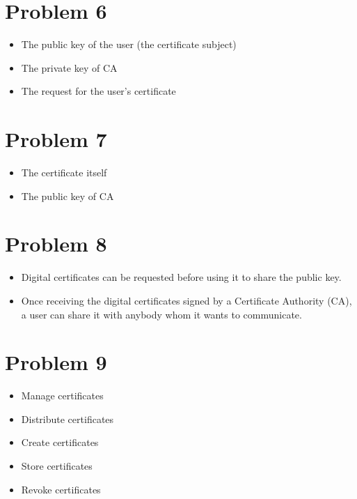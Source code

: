 \documentclass[11pt]{article}
\begin{document}
\section*{Problem 6}
\label{sec:org0d484ec}
\begin{itemize}
\item The public key of the user (the certificate subject)
\item The private key of CA
\item The request for the user's certificate
\end{itemize}
\section*{Problem 7}
\label{sec:org17f4ea5}
\begin{itemize}
\item The certificate itself
\item The public key of CA
\end{itemize}
\section*{Problem 8}
\label{sec:org1ae3f70}
\begin{itemize}
\item Digital certificates can be requested before using it to share the public key.
\item Once receiving the digital certificates signed by a Certificate Authority
(CA), a user can share it with anybody whom it wants to communicate.
\end{itemize}
\section*{Problem 9}
\label{sec:orgb82973f}
\begin{itemize}
\item Manage certificates
\item Distribute certificates
\item Create certificates
\item Store certificates
\item Revoke certificates
\end{itemize}
\end{document}
